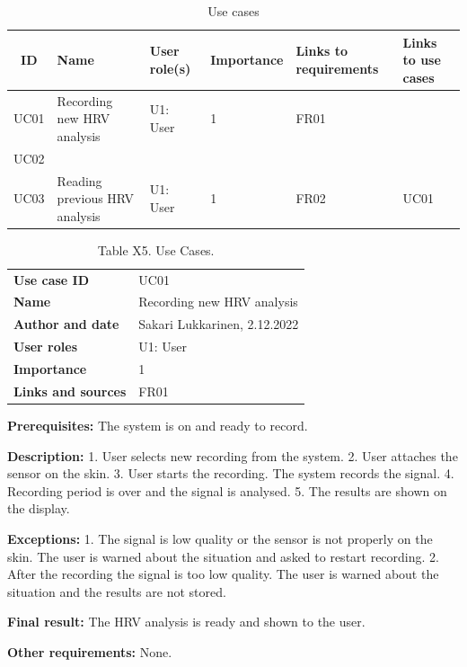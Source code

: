 \documentclass{article}
\begin{document}
\begin{table}[h]
\centering
\begin{tabular}{|c|p{3cm}|p{2cm}|p{2cm}|p{2cm}|p{2cm}|}
\hline
\textbf{ID} & \textbf{Name} & \textbf{User role(s)} & \textbf{Importance} & \textbf{Links to requirements} & \textbf{Links to use cases} \\
\hline
UC01 & Recording new HRV analysis & U1: User & 1 & FR01 & \\
\hline
UC02 & & & & & \\
\hline
UC03 & Reading previous HRV analysis & U1: User & 1 & FR02 & UC01 \\
\hline
\end{tabular}
\caption{Use cases}
\label{tab:my_label}
\end{table}

\begin{table}[h]
\caption{Table X5. Use Cases.}
\label{table:X5}
\begin{tabular}{|l|l|}
\hline
\textbf{Use case ID} & UC01 \\
\textbf{Name} & Recording new HRV analysis \\
\textbf{Author and date} & Sakari Lukkarinen, 2.12.2022 \\
\textbf{User roles} & U1: User \\
\textbf{Importance} & 1 \\
\textbf{Links and sources} & FR01 \\
\hline
\end{tabular}
\end{table}

\textbf{Prerequisites:} The system is on and ready to record.

\textbf{Description:}
1. User selects new recording from the system.
2. User attaches the sensor on the skin.
3. User starts the recording. The system records the signal.
4. Recording period is over and the signal is analysed.
5. The results are shown on the display.

\textbf{Exceptions:}
1. The signal is low quality or the sensor is not properly on the skin. The user is warned about the situation and asked to restart recording.
2. After the recording the signal is too low quality. The user is warned about the situation and the results are not stored.

\textbf{Final result:} The HRV analysis is ready and shown to the user.

\textbf{Other requirements:} None.
\end{document}
